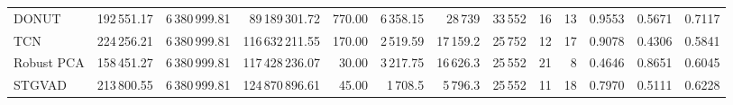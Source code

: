 \documentclass[a4paper,12pt]{report}
\begin{document}
\begin{table}[H]
\begin{tabular}{lrrrrrrrrrrrr}
DONUT & 192\,551.17 & 6\,380\,999.81 & 89\,189\,301.72 & 770.00 & 6\,358.15 & 28\,739 & 33\,552 & 16 & 13 & 0.9553 & 0.5671 & 0.7117 \\
TCN & 224\,256.21 & 6\,380\,999.81 & 116\,632\,211.55 & 170.00 & 2\,519.59 & 17\,159.2 & 25\,752 & 12 & 17 & 0.9078 & 0.4306 & 0.5841 \\
Robust PCA & 158\,451.27 & 6\,380\,999.81 & 117\,428\,236.07 & 30.00 & 3\,217.75 & 16\,626.3 & 25\,552 & 21 & 8 & 0.4646 & 0.8651 & 0.6045 \\
STGVAD & 213\,800.55 & 6\,380\,999.81 & 124\,870\,896.61 & 45.00 & 1\,708.5 & 5\,796.3 & 25\,552 & 11 & 18 & 0.7970 & 0.5111 & 0.6228 \\
\bottomrule
\end{tabular}
\end{table}
\end{document}

